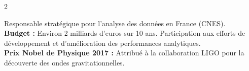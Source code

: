 \documentclass[8pt,a4paper,ragged2e,withhyper]{../_shared/altacv}
\begin{document}
\begin{paracol}{2}

Responsable stratégique pour l’analyse des données en France (CNES). \\
\textbf{Budget : }Environ 2 milliards d’euros sur 10 ans.
\divider
{}
Participation aux efforts de développement et d’amélioration des performances analytiques. \\
\textbf{Prix Nobel de Physique 2017 : }Attribué à la collaboration LIGO pour la découverte des ondes gravitationnelles.

\divider
{}
\divider
{}

\end{paracol}
\end{document}
